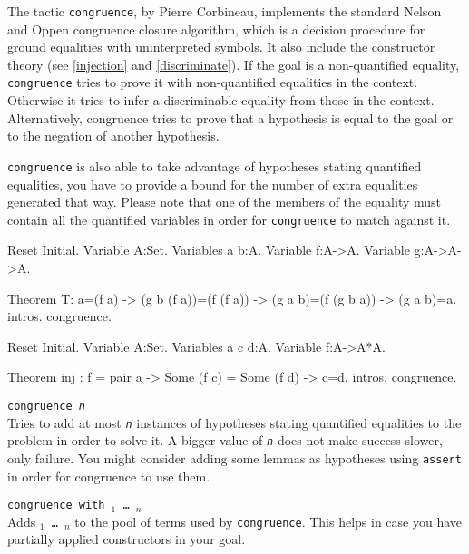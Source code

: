 The tactic {\tt congruence}, by Pierre Corbineau, implements the standard Nelson and Oppen
congruence closure algorithm, which is a decision procedure for ground
equalities with uninterpreted symbols. It also include the constructor theory
(see \ref{injection} and \ref{discriminate}).
If the goal is a non-quantified equality, {\tt congruence} tries to
prove it with non-quantified equalities in the context. Otherwise it
tries to infer a discriminable equality from those in the context. Alternatively, congruence tries to prove that a hypothesis is equal to the goal or to the negation of another hypothesis.

{\tt congruence} is also able to take advantage of hypotheses stating quantified equalities, you have to provide a bound for the number of extra equalities generated that way. Please note that one of the members of the equality must contain all the quantified variables in order for {\tt congruence} to match against it. 

\begin{coq_eval}
Reset Initial.
Variable A:Set.
Variables a b:A.
Variable f:A->A.
Variable g:A->A->A.
\end{coq_eval}

\begin{coq_example}
Theorem T: 
  a=(f a) -> (g b (f a))=(f (f a)) -> (g a b)=(f (g b a)) -> (g a b)=a.
intros.
congruence.
\end{coq_example}

\begin{coq_eval}
Reset Initial.
Variable A:Set.
Variables a c d:A.
Variable f:A->A*A.
\end{coq_eval}

\begin{coq_example}
Theorem inj : f = pair a -> Some (f c) = Some (f d) -> c=d.
intros.
congruence.
\end{coq_example}

\begin{Variants}
 \item {\tt congruence {\sl n}}\\
  Tries to add at most {\tt \sl n} instances of hypotheses stating quantified equalities to the problem in order to solve it. A bigger value of {\tt \sl n} does not make success slower, only failure. You might consider adding some lemmas as hypotheses using {\tt assert} in order for congruence to use them.

\end{Variants}

\begin{Variants}
\item {\tt congruence with \term$_1$ \dots\ \term$_n$}\\
  Adds {\tt \term$_1$ \dots\ \term$_n$} to the pool of terms used by
  {\tt congruence}. This helps in case you have partially applied
  constructors in your goal.
\end{Variants}

